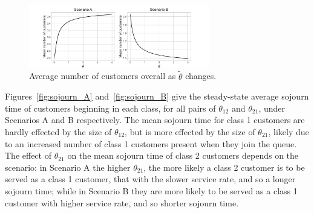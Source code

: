 \documentclass{article}
\begin{document}
\begin{figure}
  \begin{center}
    \includegraphics[width=0.7\textwidth]{img/mean_custs_equal_theta_overall.pdf}
  \end{center}
  \caption{Average number of customers overall as $\tilde{\theta}$ changes.}
  \label{fig:theta_magnitude_overall}
\end{figure}

Figures~\ref{fig:sojourn_A} and~\ref{fig:sojourn_B} give the steady-state
average sojourn time of customers beginning in each class, for all pairs of
$\theta_{12}$ and $\theta_{21}$, under Scenarios A and B respectively. The mean
sojourn time for class 1 customers are hardly effected by the size of
$\theta_{12}$, but is more effected by the size of $\theta_{21}$, likely due to
an increased number of class 1 customers present when they join the queue. The
effect of $\theta_{21}$ on the mean sojourn time of class 2 customers depends on
the scenario: in Scenario A the higher $\theta_{21}$, the more likely a class 2
customer is to be served as a class 1 customer, that with the slower service
rate, and so a longer sojourn time; while in Scenario B they are more likely to
be served as a class 1 customer with higher service rate, and so shorter sojourn
time.
\end{document}
